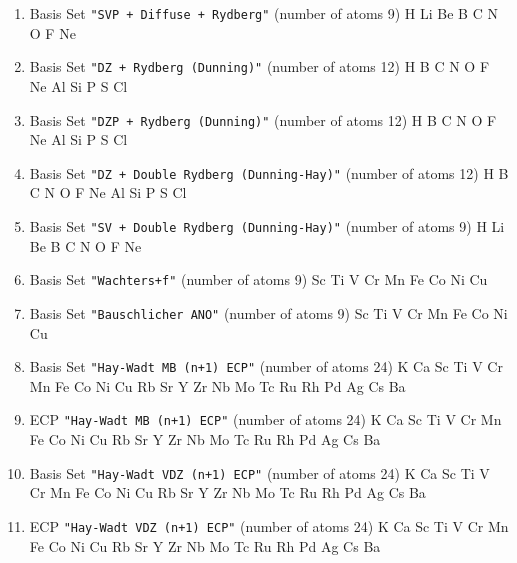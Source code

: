 \begin{enumerate}
\item Basis Set \verb#"SVP + Diffuse + Rydberg"# (number of atoms 9)  \newline 
  H Li Be B C N O F Ne


\item Basis Set \verb#"DZ + Rydberg (Dunning)"# (number of atoms 12)  \newline 
  H B C N O F Ne Al Si P S Cl


\item Basis Set \verb#"DZP + Rydberg (Dunning)"# (number of atoms 12)  \newline 
  H B C N O F Ne Al Si P S Cl


\item Basis Set \verb#"DZ + Double Rydberg (Dunning-Hay)"# (number of atoms 12)  \newline 
  H B C N O F Ne Al Si P S Cl


\item Basis Set \verb#"SV + Double Rydberg (Dunning-Hay)"# (number of atoms 9)  \newline 
  H Li Be B C N O F Ne


\item Basis Set \verb#"Wachters+f"# (number of atoms 9)  \newline 
  Sc Ti V Cr Mn Fe Co Ni Cu


\item Basis Set \verb#"Bauschlicher ANO"# (number of atoms 9)  \newline 
  Sc Ti V Cr Mn Fe Co Ni Cu


\item Basis Set \verb#"Hay-Wadt MB (n+1) ECP"# (number of atoms 24)  \newline 
  K Ca Sc Ti V Cr Mn Fe Co Ni Cu Rb Sr Y Zr Nb Mo Tc Ru Rh Pd Ag Cs Ba


\item ECP \verb#"Hay-Wadt MB (n+1) ECP"# (number of atoms 24)  \newline 
  K Ca Sc Ti V Cr Mn Fe Co Ni Cu Rb Sr Y Zr Nb Mo Tc Ru Rh Pd Ag Cs Ba


\item Basis Set \verb#"Hay-Wadt VDZ (n+1) ECP"# (number of atoms 24)  \newline 
  K Ca Sc Ti V Cr Mn Fe Co Ni Cu Rb Sr Y Zr Nb Mo Tc Ru Rh Pd Ag Cs Ba


\item ECP \verb#"Hay-Wadt VDZ (n+1) ECP"# (number of atoms 24)  \newline 
  K Ca Sc Ti V Cr Mn Fe Co Ni Cu Rb Sr Y Zr Nb Mo Tc Ru Rh Pd Ag Cs Ba



\end{enumerate}
